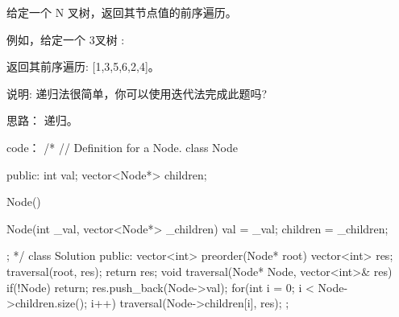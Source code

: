 给定一个 N 叉树，返回其节点值的前序遍历。

例如，给定一个 3叉树 :

 

 

返回其前序遍历: [1,3,5,6,2,4]。

 

说明: 递归法很简单，你可以使用迭代法完成此题吗?































思路：
递归。





























code：
/*
// Definition for a Node.
class Node {
public:
    int val;
    vector<Node*> children;

    Node() {}

    Node(int _val, vector<Node*> _children) {
        val = _val;
        children = _children;
    }
};
*/
class Solution {
public:
    vector<int> preorder(Node* root) {
        vector<int> res;
        traversal(root, res);
        return res;
    }
    void traversal(Node* Node, vector<int>& res)
    {
        if(!Node) return;
        res.push_back(Node->val);
        for(int i = 0; i < Node->children.size(); i++)
        {
            traversal(Node->children[i], res);
        }
    }
};